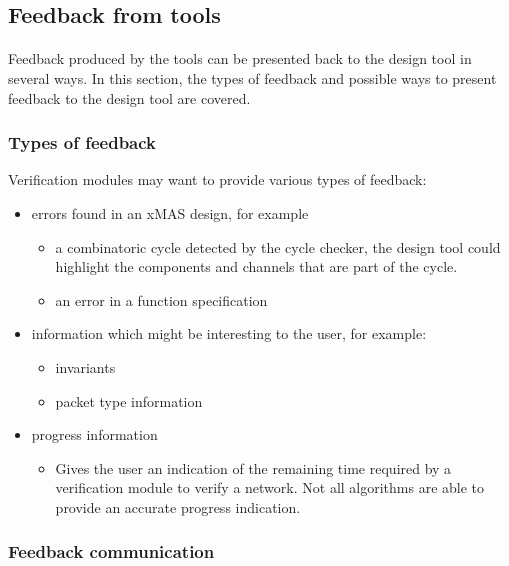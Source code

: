 \documentclass[a4paper,11pt]{article}
\begin{document}
\subsection{Feedback from tools}

\paragraph{}
Feedback produced by the tools can be presented back to the design tool
in several ways. In this section, the types of feedback and possible
ways to present feedback to the design tool are covered.

\subsubsection{Types of feedback}
Verification modules may want to provide various types of feedback:
\begin{itemize}
 \item errors found in an xMAS design, for example
 \begin{itemize}
  \item a combinatoric cycle detected by the cycle checker, the design tool
  could highlight the components and channels that are part of the cycle.
  \item an error in a function specification
 \end{itemize}

 \item information which might be interesting to the user, for example:
 \begin{itemize}
  \item invariants
  \item packet type information
 \end{itemize}

 \item progress information
 \begin{itemize}
  \item Gives the user an indication of the remaining time required by a
  verification module to verify a network. Not all algorithms are able to
  provide an accurate progress indication.
 \end{itemize}


\end{itemize}


\subsubsection{Feedback communication}
\end{document}
